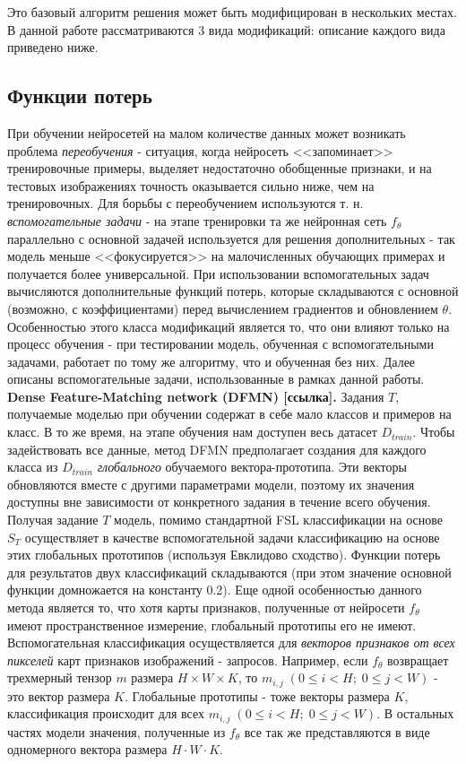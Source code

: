 \documentclass[a4paper, 12pt]{report}
\begin{document}
Это базовый алгоритм решения может быть модифицирован в нескольких местах. В данной работе рассматриваются 3 вида модификаций: описание каждого вида приведено ниже.

\subsection{Функции потерь}
При обучении нейросетей на малом количестве данных может возникать проблема \textit{переобучения} - ситуация, когда нейросеть <<запоминает>> тренировочные примеры, выделяет недостаточно обобщенные признаки, и на тестовых изображениях точность оказывается сильно ниже, чем на тренировочных. Для борьбы с переобучением используются т. н. \textit{вспомогательные задачи} - на этапе тренировки та же нейронная сеть $f_{\theta}$ параллельно с основной задачей используется для решения дополнительных - так модель меньше <<фокусируется>> на малочисленных обучающих примерах и получается более универсальной. При использовании вспомогательных задач вычисляются дополнительные функций потерь, которые складываются с основной (возможно, с коэффициентами) перед вычислением градиентов и обновлением $\theta$. Особенностью этого класса модификаций является то, что они влияют только на процесс обучения - при тестировании модель, обученная с вспомогательными задачами, работает по тому же алгоритму, что и обученная без них. Далее описаны вспомогательные задачи, использованные в рамках данной работы. \\

\textbf {Dense Feature-Matching network (DFMN) [ссылка].} Задания $T$, получаемые моделью при обучении содержат в себе мало классов и примеров на класс. В то же время, на этапе обучения нам доступен весь датасет $D_{train}$. Чтобы задействовать все данные, метод DFMN предполагает создания для каждого класса из $D_{train}$ \textit{глобального} обучаемого вектора-прототипа. Эти векторы обновляются вместе с другими параметрами модели, поэтому их значения доступны вне зависимости от конкретного задания в течение всего обучения. Получая задание $T$ модель, помимо стандартной FSL классификации на основе $S_{T}$ осуществляет в качестве вспомогательной задачи классификацию на основе этих глобальных прототипов (используя Евклидово сходство). Функции потерь для результатов двух классификаций складываются (при этом значение основной функции домножается на константу 0.2).  Еще одной особенностью данного метода является то, что хотя карты признаков, полученные от нейросети $f_{\theta}$ имеют пространственное измерение, глобальный прототипы его не имеют. Вспомогательная классификация осуществляется для \textit{векторов признаков от всех пикселей} карт признаков изображений - запросов. Например, если $f_{\theta}$ возвращает трехмерный тензор $m$ размера $H \times W \times K$, то $m_{i, j} \; (0 \le i < H; \; 0 \le j < W)$ - это вектор размера $K$. Глобальные прототипы - тоже векторы размера $K$, классификация происходит для всех $m_{i, j} \; (0 \le i < H; \; 0 \le j < W)$. В остальных частях модели значения, полученные из $f_{\theta}$ все так же представляются в виде одномерного вектора размера $H \cdot W \cdot K$. \\
\end{document}
